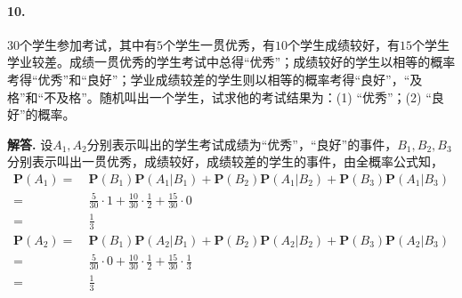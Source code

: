 \documentclass[12pt, a4paper, oneside]{ctexart}
\newenvironment{solution}{\par\noindent\textbf{解答. }}{\bigskip\par}
\begin{document}
\paragraph{10.}$30$个学生参加考试，其中有$5$个学生一贯优秀，有$10$个学生成绩较好，有$15$个学生学业较差。成绩一贯优秀的学生考试中总得“优秀”；成绩较好的学生以相等的概率考得“优秀”和“良好”；学业成绩较差的学生则以相等的概率考得“良好”，“及格”和“不及格”。随机叫出一个学生，试求他的考试结果为：(1) “优秀”；(2) “良好”的概率。
\begin{solution}
    设$A_1,A_2$分别表示叫出的学生考试成绩为“优秀”，“良好”的事件，$B_1,B_2,B_3$分别表示叫出一贯优秀，成绩较好，成绩较差的学生的事件，由全概率公式知，
    \begin{equation*}
        \begin{aligned}
            \textbf{P}(A_1) =&\ \textbf{P}(B_1)\textbf{P}(A_1|B_1)+\textbf{P}(B_2)\textbf{P}(A_1|B_2)+\textbf{P}(B_3)\textbf{P}(A_1|B_3)\\
            =&\ \frac{5}{30}\cdot 1+\frac{10}{30}\cdot \frac{1}{2}+\frac{15}{30}\cdot 0\\
            =&\ \frac{1}{3}
        \end{aligned}
    \end{equation*}
    \begin{equation*}
        \begin{aligned}
            \textbf{P}(A_2) =&\ \textbf{P}(B_1)\textbf{P}(A_2|B_1)+\textbf{P}(B_2)\textbf{P}(A_2|B_2)+\textbf{P}(B_3)\textbf{P}(A_2|B_3)\\
            =&\ \frac{5}{30}\cdot 0+\frac{10}{30}\cdot \frac{1}{2}+\frac{15}{30}\cdot \frac{1}{3}\\
            =&\ \frac{1}{3}
        \end{aligned}
    \end{equation*}
\end{solution}
\end{document}
